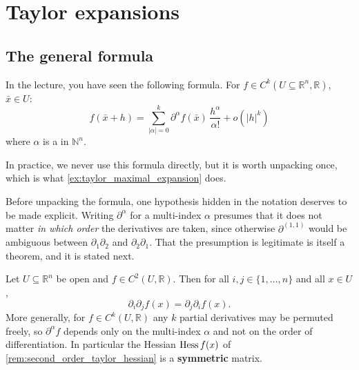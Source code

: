 
\section{Taylor expansions}
\label{sec:taylor_expansions}

\subsection{The general formula}

In the lecture, you have seen the following formula. For
$f \in C^k(U \subseteq \mathbb{R}^n, \mathbb{R})$, $\bar x \in U$:
\[f(\bar x + h) = \sum_{|\alpha| = 0}^{k} \partial^\alpha f(\bar x)\,\frac{h^\alpha}{\alpha!} + o(|h|^k)\]
where $\alpha$ is a   in $\mathbb{N}^n$.

In practice, we never use this formula directly, but it is worth unpacking once, which is what
\cref{ex:taylor_maximal_expansion} does.

Before unpacking the formula, one hypothesis hidden in the notation deserves to be made explicit.
Writing $\partial^\alpha$ for a multi-index $\alpha$ presumes that it does not matter \emph{in
which order} the derivatives are taken, since otherwise $\partial^{(1,1)}$ would be ambiguous
between $\partial_1\partial_2$ and $\partial_2\partial_1$. That the presumption is legitimate is
itself a theorem, and it is stated next.

\begin{theorem}
\label{thm:schwarz_mixed_partials}
Let $U \subseteq \mathbb{R}^n$ be open and $f \in C^2(U,\mathbb{R})$. Then for all
$i,j \in \{1,\dots,n\}$ and all $x \in U$,
\[\partial_i\partial_j f(x) = \partial_j\partial_i f(x).\]
More generally, for $f \in C^k(U,\mathbb{R})$ any $k$ partial derivatives may be permuted
freely, so $\partial^\alpha f$ depends only on the multi-index $\alpha$ and not on the order of
differentiation. In particular the Hessian $\operatorname{Hess} f(x)$ of
\cref{rem:second_order_taylor_hessian} is a \textbf{symmetric} matrix.
\end{theorem}

